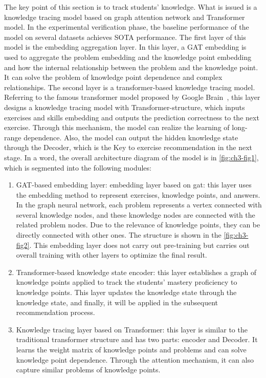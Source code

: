 The key point of this section is to track students' knowledge. What is issued is a knowledge tracing model based on graph attention network and Transformer model. In the experimental verification phase, the baseline performance of the model on several datasets achieves SOTA performance. The first layer of this model is the embedding aggregation layer. In this layer, a GAT embedding is used to aggregate the problem embedding and the knowledge point embedding and how the internal relationship between the problem and the knowledge point. It can solve the problem of knowledge point dependence and complex relationships. The second layer is a transformer-based knowledge tracing model. Referring to the famous transformer model proposed by Google Brain~\cite{vaswani2017attention}, this layer designs a knowledge tracing model with Transformer-structure, which inputs exercises and skills embedding and outputs the prediction correctness to the next exercise. Through this mechanism, the model can realize the learning of long-range dependence. Also, the model can output the hidden knowledge state through the Decoder, which is the Key to exercise recommendation in the next stage. In a word, the overall architecture diagram of the model is in \figurename{\ref{fig:ch3-fig1}}, which is segmented into the following modules:
\begin{enumerate}
	\item GAT-based embedding layer: embedding layer based on gat: this layer uses the embedding method to represent exercises, knowledge points, and answers. In the graph neural network, each problem represents a vertex connected with several knowledge nodes, and these knowledge nodes are connected with the related problem nodes. Due to the relevance of knowledge points, they can be directly connected with other ones. The structure is shown in the \figurename{\ref{fig:ch3-fig2}}. This embedding layer does not carry out pre-training but carries out overall training with other layers to optimize the final result.
	\item Transformer-based knowledge state encoder: this layer establishes a graph of knowledge points applied to track the students' mastery proficiency to knowledge points. This layer updates the knowledge state through the knowledge state, and finally, it will be applied in the subsequent recommendation process.
	\item Knowledge tracing layer based on Transformer: this layer is similar to the traditional transformer structure and has two parts: encoder and Decoder. It learns the weight matrix of knowledge points and problems and can solve knowledge point dependence. Through the attention mechanism, it can also capture similar problems of knowledge points.
\end{enumerate}

